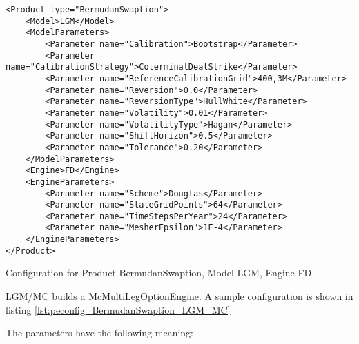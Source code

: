 \begin{longlisting}
\begin{verbatim}
<Product type="BermudanSwaption">
    <Model>LGM</Model>
    <ModelParameters>
        <Parameter name="Calibration">Bootstrap</Parameter>
        <Parameter name="CalibrationStrategy">CoterminalDealStrike</Parameter>
        <Parameter name="ReferenceCalibrationGrid">400,3M</Parameter>
        <Parameter name="Reversion">0.0</Parameter>
        <Parameter name="ReversionType">HullWhite</Parameter>
        <Parameter name="Volatility">0.01</Parameter>
        <Parameter name="VolatilityType">Hagan</Parameter>
        <Parameter name="ShiftHorizon">0.5</Parameter>
        <Parameter name="Tolerance">0.20</Parameter>
    </ModelParameters>
    <Engine>FD</Engine>
    <EngineParameters>
        <Parameter name="Scheme">Douglas</Parameter>
        <Parameter name="StateGridPoints">64</Parameter>
        <Parameter name="TimeStepsPerYear">24</Parameter>
        <Parameter name="MesherEpsilon">1E-4</Parameter>
    </EngineParameters>
</Product>
\end{verbatim}
\caption{Configuration for Product BermudanSwaption, Model LGM, Engine FD}
\label{lst:peconfig_BermudanSwaption_LGM_FD}
\end{longlisting}

LGM/MC builds a McMultiLegOptionEngine. A sample configuration is shown in
listing \ref{lst:peconfig_BermudanSwaption_LGM_MC}

The parameters have the following meaning:

